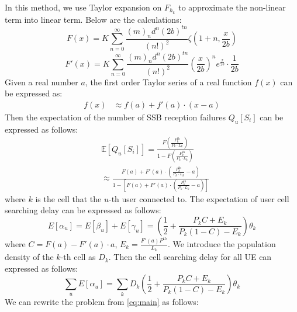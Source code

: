 In this method, we use Taylor expansion on $F_{h_k}$ to approximate the non-linear term into linear term. Below are the calculations:
\begin{equation}
    F(x) = K \sum_{n=0}^\infty \frac{(m)_n d^n (2b)^{tn}}{(n!)^2} \zeta(1+n, \frac{x}{2b})
\end{equation}
\begin{equation}
    F'(x) = K \sum_{n=0}^\infty \frac{(m)_n d^n (2b)^{tn}}{(n!)^2} \left( \frac{x}{2b} \right)^n e^{\frac{x}{2b}} \cdot \frac{1}{2b}
\end{equation}
Given a real number $a$, the first order Taylor series of a real function $f(x)$ can be expressed as:
\begin{equation}
    \begin{aligned}
        f(x) &\approx f(a) + f'(a)\cdot(x-a)
    \end{aligned}
\end{equation}
Then the expectation of the number of SSB reception failures $Q_u[S_i]$ can be expressed as follows:
\begin{equation}
    \begin{aligned}
        &\mathbb{E}[Q_u[S_i]] = \frac{F\left( \frac{P_k^{\text{th}}}{P_k \cdot L_k} \right)}{1 - F\left( \frac{P_k^{\text{th}}}{P_k \cdot L_k} \right)} \\
        &\approx \frac{F(a) + F'(a) \cdot \left( \frac{P_k^{\text{th}}}{P_k \cdot L_k} - a \right)}{1 - \left[ F(a) + F'(a) \cdot \left( \frac{P_k^{\text{th}}}{P_k \cdot L_k} - a \right) \right]}
    \end{aligned}
\end{equation}
where $k$ is the cell that the $u$-th user connected to. The expectation of user cell searching delay can be expressed as follows:
\begin{equation}
    E[\alpha_u] = E[\beta_u] + E[\gamma_u]
    =\left( \frac{1}{2} + \frac{P_k C + E_k}{P_k (1-C) - E_k} \right) \theta_k
\end{equation}
where $C = F(a) - F'(a)\cdot a$, $E_k = \frac{F'(a) P^{th}}{L_k}$. We introduce the population density of the $k$-th cell as $D_k$. Then the cell searching delay for all UE can expressed as follows:
\begin{equation}
    \sum_u E[\alpha_u] = \sum_k D_k \left( \frac{1}{2} + \frac{P_k C + E_k}{P_k (1-C) - E_k} \right) \theta_k
\end{equation}
We can rewrite the problem from \ref{eq:main} as follows:
